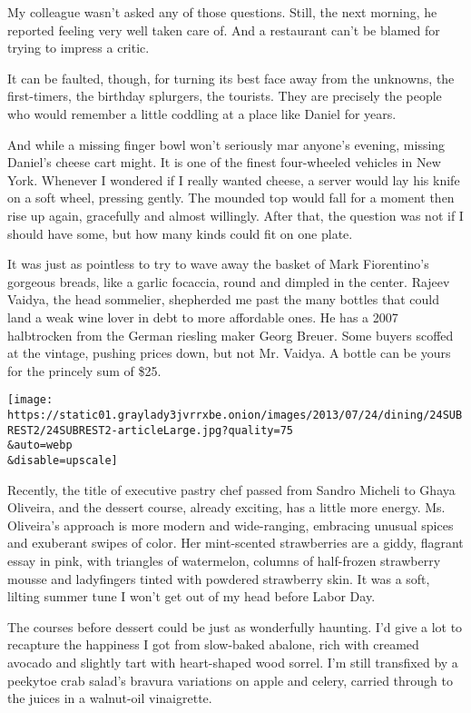 My colleague wasn't asked any of those questions. Still, the next
morning, he reported feeling very well taken care of. And a restaurant
can't be blamed for trying to impress a critic.

It can be faulted, though, for turning its best face away from the
unknowns, the first-timers, the birthday splurgers, the tourists. They
are precisely the people who would remember a little coddling at a place
like Daniel for years.

And while a missing finger bowl won't seriously mar anyone's evening,
missing Daniel's cheese cart might. It is one of the finest four-wheeled
vehicles in New York. Whenever I wondered if I really wanted cheese, a
server would lay his knife on a soft wheel, pressing gently. The mounded
top would fall for a moment then rise up again, gracefully and almost
willingly. After that, the question was not if I should have some, but
how many kinds could fit on one plate.

It was just as pointless to try to wave away the basket of Mark
Fiorentino's gorgeous breads, like a garlic focaccia, round and dimpled
in the center. Rajeev Vaidya, the head sommelier, shepherded me past the
many bottles that could land a weak wine lover in debt to more
affordable ones. He has a 2007 halbtrocken from the German riesling
maker Georg Breuer. Some buyers scoffed at the vintage, pushing prices
down, but not Mr. Vaidya. A bottle can be yours for the princely sum of
\$25.

\texttt{[image: https://static01.graylady3jvrrxbe.onion/images/2013/07/24/dining/24SUBREST2/24SUBREST2-articleLarge.jpg?quality=75\\\&auto=webp\\\&disable=upscale]}

Recently, the title of executive pastry chef passed from Sandro Micheli
to Ghaya Oliveira, and the dessert course, already exciting, has a
little more energy. Ms. Oliveira's approach is more modern and
wide-ranging, embracing unusual spices and exuberant swipes of color.
Her mint-scented strawberries are a giddy, flagrant essay in pink, with
triangles of watermelon, columns of half-frozen strawberry mousse and
ladyfingers tinted with powdered strawberry skin. It was a soft, lilting
summer tune I won't get out of my head before Labor Day.

The courses before dessert could be just as wonderfully haunting. I'd
give a lot to recapture the happiness I got from slow-baked abalone,
rich with creamed avocado and slightly tart with heart-shaped wood
sorrel. I'm still transfixed by a peekytoe crab salad's bravura
variations on apple and celery, carried through to the juices in a
walnut-oil vinaigrette.

